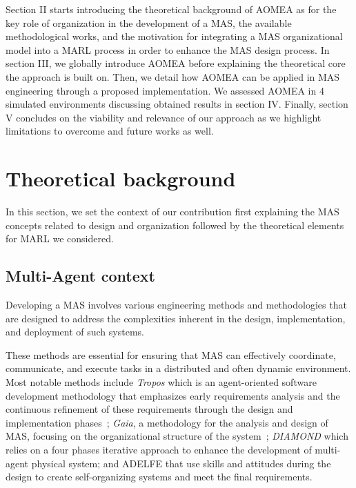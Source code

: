 \documentclass[runningheads]{llncs}
\begin{document}
Section II starts introducing the theoretical background of AOMEA as for the key role of organization in the development of a MAS, the available methodological works, and the motivation for integrating a MAS organizational model into a MARL process in order to enhance the MAS design process. In section III, we globally introduce AOMEA before explaining the theoretical core the approach is built on. Then, we detail how AOMEA can be applied in MAS engineering through a proposed implementation. We assessed AOMEA in 4 simulated environments discussing obtained results in section IV. Finally, section V concludes on the viability and relevance of our approach as we highlight limitations to overcome and future works as well.


\section{Theoretical background}





In this section, we set the context of our contribution first explaining the MAS concepts related to design and organization followed by the theoretical elements for MARL we considered.

\subsection{Multi-Agent context}


Developing a MAS involves various engineering methods and methodologies that are designed to address the complexities inherent in the design, implementation, and deployment of such systems.

These methods are essential for ensuring that MAS can effectively coordinate, communicate, and execute tasks in a distributed and often dynamic environment. Most notable methods include \emph{Tropos} which is an agent-oriented software development methodology that emphasizes early requirements analysis and the continuous refinement of these requirements through the design and implementation phases~\cite{Bresciani2004}; \emph{Gaia}, a methodology for the analysis and design of MAS, focusing on the organizational structure of the system~\cite{Zambonelli2003}; \emph{DIAMOND} which relies on a four phases iterative approach to enhance the development of multi-agent physical system; and {ADELFE} that use skills and attitudes during the design to create self-organizing systems and meet the final requirements.
\end{document}
